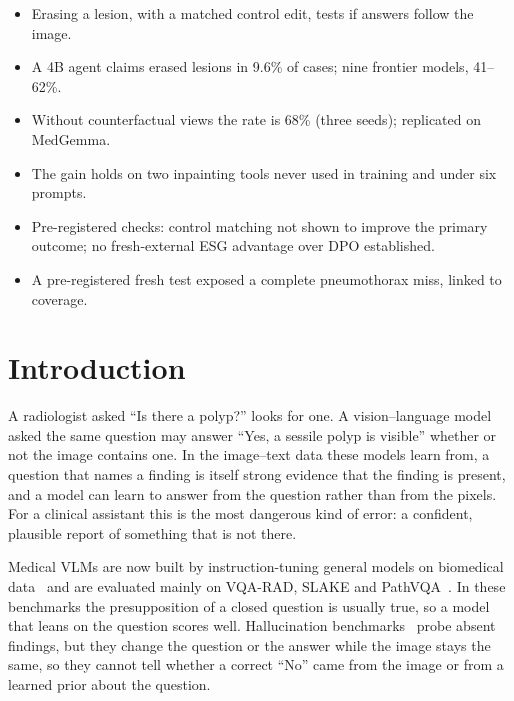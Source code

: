 \documentclass[11pt]{article}
\begin{document}
\begin{tcolorbox}[colback=blue!3,colframe=blue!40!black,title=Highlights,fonttitle=\bfseries\small]
\small
\begin{itemize}[leftmargin=*,nosep]
\item Erasing a lesion, with a matched control edit, tests if answers follow the image.
\item A 4B agent claims erased lesions in 9.6\% of cases; nine frontier models, 41--62\%.
\item Without counterfactual views the rate is 68\% (three seeds); replicated on MedGemma.
\item The gain holds on two inpainting tools never used in training and under six prompts.
\item Pre-registered checks: control matching not shown to improve the primary outcome; no fresh-external ESG advantage over DPO established.
\item A pre-registered fresh test exposed a complete pneumothorax miss, linked to coverage.
\end{itemize}
\end{tcolorbox}

\section{Introduction}

A radiologist asked ``Is there a polyp?'' looks for one. A vision--language model asked the same question may answer ``Yes, a sessile polyp is visible'' whether or not the image contains one. In the image--text data these models learn from, a question that names a finding is itself strong evidence that the finding is present, and a model can learn to answer from the question rather than from the pixels. For a clinical assistant this is the most dangerous kind of error: a confident, plausible report of something that is not there.

Medical VLMs are now built by instruction-tuning general models on biomedical data~\cite{llavamed,huatuo,medgemma,medgemma15,lingshu} and are evaluated mainly on VQA-RAD, SLAKE and PathVQA~\cite{vqarad,slake,pathvqa}. In these benchmarks the presupposition of a closed question is usually true, so a model that leans on the question scores well. Hallucination benchmarks~\cite{pope,cares,medhallmark,medvh,medheval} probe absent findings, but they change the question or the answer while the image stays the same, so they cannot tell whether a correct ``No'' came from the image or from a learned prior about the question.
\end{document}
